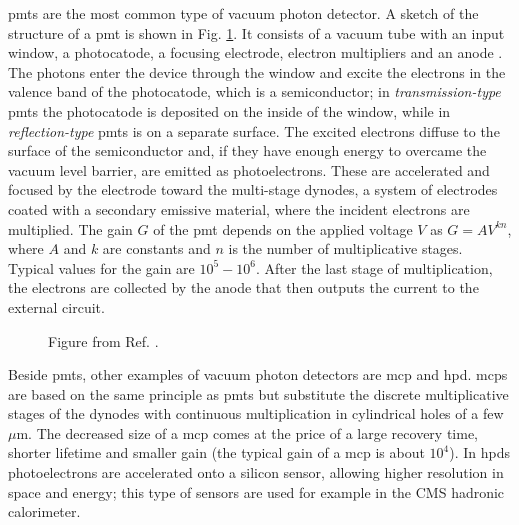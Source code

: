 \glspl{pmt} are the most common type of vacuum photon detector. A sketch of the structure of a \gls{pmt} is shown in Fig. \ref{fig:det:pmt}. It consists of a vacuum tube with an input window, a photocatode, a focusing electrode, electron multipliers and an anode  \cite{hamamatsu}. The photons enter the device through the window and excite the electrons in the valence band of the photocatode, which is a semiconductor; in \textit{transmission-type} \glspl{pmt} the photocatode is deposited on the inside of the window, while in \textit{reflection-type} \glspl{pmt} is on a separate surface. The excited electrons diffuse to the surface of the semiconductor and, if they have enough energy to overcame the vacuum level barrier, are emitted as photoelectrons. These are accelerated and focused by the electrode toward the multi-stage dynodes, a system of electrodes coated with a secondary emissive material, where the incident electrons are multiplied. The gain $G$ of the \gls{pmt} depends on the applied voltage $V$ as $G=AV^{kn}$, where $A$ and $k$ are constants and $n$ is the number of multiplicative stages. Typical values for the gain are $10^5-10^6$. After the last stage of multiplication, the electrons are collected by the anode that then outputs the current to the external circuit.

\begin{figure}[ht]
\centering
{}
\caption{Figure from Ref. \cite{hamamatsu}.}
\label{fig:det:pmt}
\end{figure}

Beside \glspl{pmt}, other examples of vacuum photon detectors are \gls{mcp} and \gls{hpd}. \glspl{mcp} are based on the same principle as \glspl{pmt} but substitute the discrete multiplicative stages of the dynodes with continuous multiplication in cylindrical holes of a few $\mu$m. The decreased size of a \gls{mcp} comes at the price of a large recovery time, shorter lifetime and smaller gain (the typical gain of a \gls{mcp} is about $10^4$). In \glspl{hpd} photoelectrons are accelerated onto a silicon sensor, allowing higher resolution in space and energy; this type of sensors are used for example in the CMS hadronic calorimeter.


